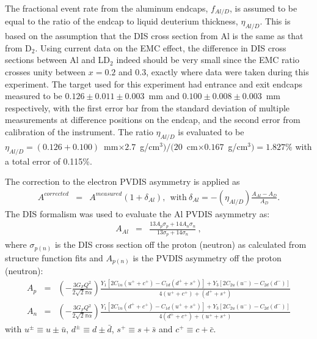 The fractional event rate from the aluminum endcaps, $f_{Al/D}$, is assumed to be equal to the ratio of the endcap
to liquid deuterium thickness, $\eta_{Al/D}$. 
This is based on the assumption that the DIS cross section from Al is the same as that from D$_2$. 
Using current data on the EMC effect, the difference in 
DIS cross sections between Al and LD$_2$ indeed should be very small since the EMC ratio crosses unity
between $x=0.2$ and $0.3$, exactly where data were taken during this experiment. 
The target used for this experiment had entrance and exit endcaps measured to be $0.126\pm 0.011\pm 0.003$~mm
and $0.100\pm 0.008\pm 0.003$~mm respectively, with the first error bar from the standard deviation of 
multiple measurements at difference positions on the endcap, and the second error from calibration of
the instrument. The ratio $\eta_{Al/D}$ is evaluated to be 
$\eta_{Al/D}=(0.126+0.100)$~mm$\times 2.7$~g/cm$^3)/(20$~cm$\times 0.167$~g/cm$^3)=1.827\%$ with a total
error of 0.115\%.

The correction to the electron PVDIS asymmetry is applied as
\begin{eqnarray}
  A^{corrected} &=& A^{measured}(1+\delta_{Al}),~~\mathrm{with}~\delta_{Al} = -(\eta_{Al/D})\frac{A_{Al}-A_{D}}{A_D}.
\end{eqnarray}
The DIS formalism was used to evaluate the Al PVDIS asymmetry as:
\begin{eqnarray}
  A_{Al} &=& \frac{13A_p\sigma_p+14A_n\sigma_n}{13\sigma_p+14\sigma_n}~,
\end{eqnarray}
where $\sigma_{p(n)}$ is the DIS cross section off the proton (neutron) as calculated from structure function
fits and $A_{p(n)}$ is the PVDIS asymmetry off the proton (neutron):
\begin{eqnarray}
  A_p &=& \left(-\frac{3 G_FQ^2}{2\sqrt{2}\pi \alpha}\right)
    \frac{Y_1\left[2C_{1u}(u^++c^+)-C_{1d}(d^+ +s^+)\right]
         +Y_3\left[2C_{2u}(u^-)-C_{2d}(d^-)\right]}
         {4(u^++c^+)+(d^++s^+)}\\
  A_n &=& \left(-\frac{3 G_FQ^2}{2\sqrt{2}\pi \alpha}\right)
    \frac{Y_1\left[2C_{1u}(d^++c^+)-C_{1d}(u^++s^+)\right]
         +Y_3\left[2C_{2u}(u^-)-C_{2d}(d^-)\right]}
      {4(d^++c^+)+(u^++s^+)}
\end{eqnarray}
with $u^\pm\equiv u\pm \bar u$, $d^\pm\equiv d\pm\bar d$, $s^+\equiv s+\bar s$ and $c^+\equiv c+\bar c$.

